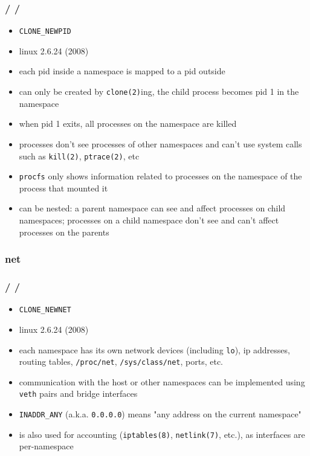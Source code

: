 \documentclass{beamer}
\newcommand{\autotitle}
{\frametitle{
    \secname
    \ifx\insertsubsection\empty
    \else
        /\subsecname
        \ifx\insertsubsubsection\empty\else/\subsubsecname\fi
    \fi}}
\begin{document}
\begin{frame}
    \autotitle
    \begin{itemize}
        \item \texttt{CLONE\_NEWPID}
        \item linux 2.6.24 (2008)
        \item each pid inside a namespace is mapped to a pid outside
        \item
            can only be created by \texttt{clone(2)}ing, the child process
            becomes pid 1 in the namespace
        \item when pid 1 exits, all processes on the namespace are killed
        \item
            processes don't see processes of other namespaces and can't use
            system calls such as \texttt{kill(2)}, \texttt{ptrace(2)}, etc
        \item
            \texttt{procfs} only shows information related to processes on the
            namespace of the process that mounted it
        \item
            can be nested: a parent namespace can see and affect processes on
            child namespaces; processes on a child namespace don't see and
            can't affect processes on the parents
    \end{itemize}
\end{frame}

\subsubsection{net}

\begin{frame}
    \autotitle
    \begin{itemize}
        \item \texttt{CLONE\_NEWNET}
        \item linux 2.6.24 (2008)
        \item
            each namespace has its own network devices (including \texttt{lo}),
            ip addresses, routing tables, \texttt{/proc/net},
            \texttt{/sys/class/net}, ports, etc.
        \item
            communication with the host or other namespaces can be
            implemented using \texttt{veth} pairs and bridge interfaces
        \item
            \texttt{INADDR\_ANY} (a.k.a. \texttt{0.0.0.0}) means "any address
            on the current namespace"
        \item
            is also used for accounting (\texttt{iptables(8)},
            \texttt{netlink(7)}, etc.), as interfaces are per-namespace
    \end{itemize}
\end{frame}
\end{document}
